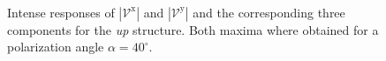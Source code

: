 \documentclass[prb,11pt,tightenlines,twocolumn,aps]{revtex4-1}
\begin{document}
\begin{figure}[tb]
    \centering
    \\
    \caption{Intense responses of $|\mathcal{V}^{\mathrm{x}}|$ and
    $|\mathcal{V}^{\mathrm{y}}|$ and the corresponding three components for the
    \emph{up} structure. Both maxima where obtained for a polarization
    angle $\alpha=40^{\circ}$. }
    \label{fig:up-vab-comp-rtp-2}
\end{figure}







\end{document}
